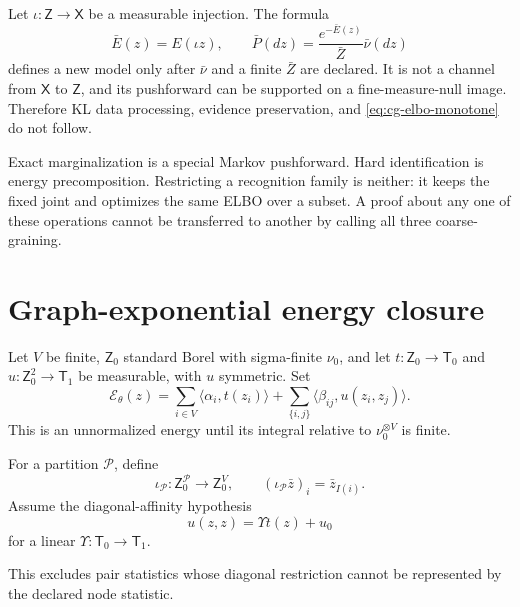 Let \(\iota:\mathsf Z\to\mathsf X\) be a measurable injection. The formula
\begin{equation}
\bar E(z)=E(\iota z),\qquad
\bar P(dz)
=\frac{e^{-\bar E(z)}}{\bar Z}\bar\nu(dz)
\label{eq:cg-energy-precomposition}
\end{equation}
defines a new model only after \(\bar\nu\) and a finite \(\bar Z\) are
declared. It is not a channel from \(\mathsf X\) to \(\mathsf Z\), and its
pushforward can be supported on a fine-measure-null image. Therefore KL data
processing, evidence preservation, and \eqref{eq:cg-elbo-monotone} do not
follow. 

Exact marginalization is a special Markov pushforward. Hard identification is
energy precomposition. Restricting a recognition family is neither: it keeps
the fixed joint and optimizes the same ELBO over a subset. A proof about any
one of these operations cannot be transferred to another by calling all
three coarse-graining. 

\section{Graph-exponential energy closure}
\label{sec:cg-graph-exponential}

Let \(V\) be finite, \(\mathsf Z_0\) standard Borel with sigma-finite
\(\nu_0\), and let
\(t:\mathsf Z_0\to\mathsf T_0\) and
\(u:\mathsf Z_0^2\to\mathsf T_1\) be measurable, with \(u\) symmetric.
Set
\begin{equation}
\mathcal E_\theta(z)
=\sum_{i\in V}\langle\alpha_i,t(z_i)\rangle
+\sum_{\{i,j\}}\langle\beta_{ij},u(z_i,z_j)\rangle.
\label{eq:cg-graph-energy}
\end{equation}
This is an unnormalized energy until its integral relative to
\(\nu_0^{\otimes V}\) is finite. 

For a partition \(\mathcal P\), define
\[
\iota_{\mathcal P}:\mathsf Z_0^{\mathcal P}\to\mathsf Z_0^V,\qquad
(\iota_{\mathcal P}\bar z)_i=\bar z_{I(i)}.
\]
Assume the diagonal-affinity hypothesis
\begin{equation}
u(z,z)=\Upsilon t(z)+u_0
\label{eq:cg-diagonal-affinity}
\end{equation}
for a linear \(\Upsilon:\mathsf T_0\to\mathsf T_1\). 

This excludes pair statistics whose diagonal restriction cannot be represented
by the declared node statistic. 

